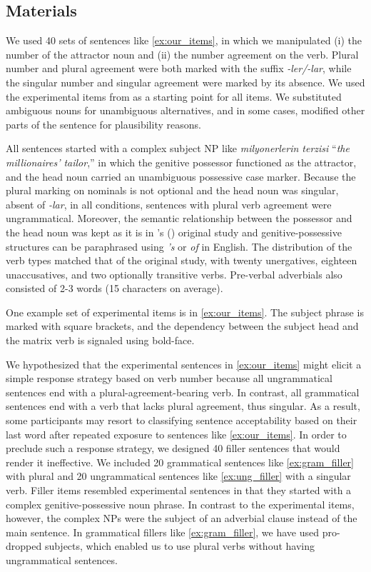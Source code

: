 \documentclass[]{interact}
\theoremstyle{plain}%
\theoremstyle{definition}
\theoremstyle{remark}
\begin{document}
\subsection{Materials}

We used 40 sets of sentences like \ref{ex:our_items}, in which we manipulated (i) the number of the attractor noun and (ii) the number agreement on the verb. Plural number and plural agreement were both marked with the suffix \textit{-ler/-lar}, while the singular number and singular agreement were marked by its absence. We used the experimental items from \citet{LagoEtAl:2019} as a starting point for all items. We substituted ambiguous nouns for unambiguous alternatives, and in some cases, modified other parts of the sentence for plausibility reasons.

All sentences started with a complex subject NP like \textit{milyonerlerin terzisi} ``\textit{the millionaires' tailor},'' in which the genitive possessor functioned as the attractor, and the head noun carried an unambiguous possessive case marker. Because the plural marking on nominals is not optional and the head noun was singular, absent of \textit{-lar}, in all conditions, sentences with plural verb agreement were ungrammatical. Moreover, the semantic relationship between the possessor and the head noun was kept as it is in \citeauthor{LagoEtAl:2019}'s (\citeyear{LagoEtAl:2019}) original study and genitive-possessive structures can be paraphrased using \textit{'s} or \textit{of} in English. The distribution of the verb types matched that of the original study, with twenty unergatives, eighteen unaccusatives, and two optionally transitive verbs. Pre-verbal adverbials also consisted of 2-3 words (15 characters on average).

One example set of experimental items is in \ref{ex:our_items}. The subject phrase is marked with square brackets, and the dependency between the subject head and the matrix verb is signaled using bold-face.


We hypothesized that the experimental sentences in \ref{ex:our_items} might elicit a simple response strategy based on verb number because all ungrammatical sentences end with a plural-agreement-bearing verb. In contrast, all grammatical sentences end with a verb that lacks plural agreement, thus singular. As a result, some participants may resort to classifying sentence acceptability based on their last word after repeated exposure to sentences like \ref{ex:our_items}. In order to preclude such a response strategy, we designed 40 filler sentences that would render it ineffective. We included 20 grammatical sentences like \ref{ex:gram_filler} with plural and 20 ungrammatical sentences like \ref{ex:ung_filler} with a singular verb. Filler items resembled experimental sentences in that they started with a complex genitive-possessive noun phrase. In contrast to the experimental items, however, the complex NPs were the subject of an adverbial clause instead of the main sentence. In grammatical fillers like \ref{ex:gram_filler}, we have used pro-dropped subjects, which enabled us to use plural verbs without having ungrammatical sentences. 
\end{document}
